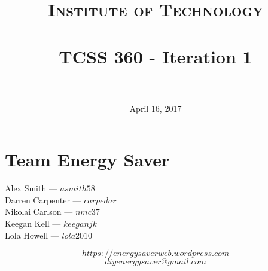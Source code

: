 \documentclass[paper=a4, fontsize=11pt]{scrartcl} %
\title{	
\normalfont \normalsize 
\textsc{Institute of Technology} \\ [25pt] %
\horrule{0.5pt} \\[0.4cm] %
\huge TCSS 360 - Iteration 1 \\ %
\horrule{2pt} \\[0.5cm] %
}
\date{April 16, 2017} %
\numberwithin{equation}{section} %
\numberwithin{figure}{section} %
\numberwithin{table}{section} %
\begin{document}
\maketitle %

\thispagestyle{empty}
\section{Team Energy Saver}
\begin{center}
Alex Smith --- $asmith58$\\
Darren Carpenter --- $carpedar$\\
Nikolai Carlson --- $nmc37$\\
Keegan Kell --- $keeganjk$\\
Lola Howell --- $lola2010$\\
\end{center}

$$https://energysaverweb.wordpress.com$$
$$diyenergysaver@gmail.com$$

\clearpage
\end{document}
